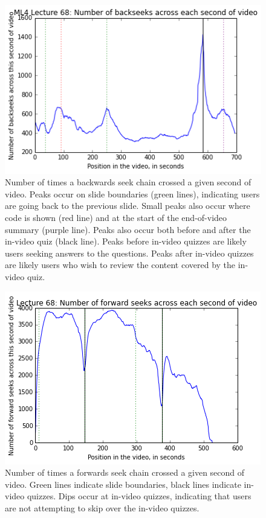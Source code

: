 \documentclass[letterpaper]{article}
\begin{document}
\begin{figure}
\includegraphics[width=1.0\columnwidth]{backseeks}
\caption{Number of times a backwards seek chain crossed a given second of video. Peaks occur on slide boundaries (green lines), indicating users are going back to the previous slide. Small peaks also occur where code is shown (red line) and at the start of the end-of-video summary (purple line). Peaks also occur both before and after the in-video quiz (black line). Peaks before in-video quizzes are likely users seeking answers to the questions. Peaks after in-video quizzes are likely users who wish to review the content covered by the in-video quiz.}
\label{fig:backseeks}
\end{figure}

\begin{figure}
\includegraphics[width=1.0\columnwidth]{fwdseek13}
\caption{Number of times a forwards seek chain crossed a given second of video. Green lines indicate slide boundaries, black lines indicate in-video quizzes. Dips occur at in-video quizzes, indicating that users are not attempting to skip over the in-video quizzes.}
\label{fig:fwdseek13}
\end{figure}
\end{document}

